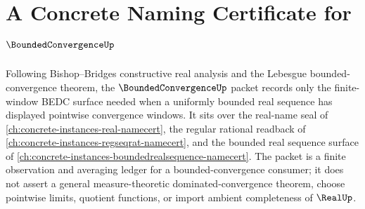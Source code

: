 \chapter{A Concrete Naming Certificate for $\BoundedConvergenceUp$}
\label{ch:concrete-instances-bounded-convergence-namecert}

Following Bishop--Bridges constructive real analysis and the Lebesgue bounded-convergence theorem, the $\BoundedConvergenceUp$ packet records only the finite-window BEDC surface needed when a uniformly bounded real sequence has displayed pointwise convergence windows. It sits over the real-name seal of \autoref{ch:concrete-instances-real-namecert}, the regular rational readback of \autoref{ch:concrete-instances-regseqrat-namecert}, and the bounded real sequence surface of \autoref{ch:concrete-instances-boundedrealsequence-namecert}. The packet is a finite observation and averaging ledger for a bounded-convergence consumer; it does not assert a general measure-theoretic dominated-convergence theorem, choose pointwise limits, quotient functions, or import ambient completeness of $\RealUp$.

